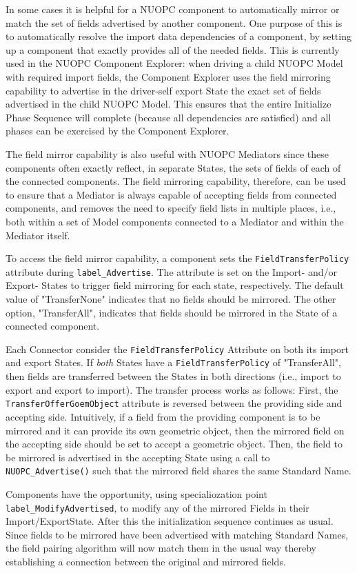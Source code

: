 %

\label{FieldMirror}

In some cases it is helpful for a NUOPC component to automatically mirror or match the set of fields advertised by another component.  One purpose of this is to automatically resolve the import data dependencies of a component, by setting up a component that exactly provides all of the needed fields.  This is currently used in the NUOPC Component Explorer:  when driving a child NUOPC Model with required import fields, the Component Explorer uses the field mirroring capability to advertise in the driver-self export State the exact set of fields advertised in the child NUOPC Model.  This ensures that the entire Initialize Phase Sequence will complete (because all dependencies are satisfied) and all phases can be exercised by the Component Explorer.

The field mirror capability is also useful with NUOPC Mediators since these components often exactly reflect, in separate States, the sets of fields of each of the connected components.  The field mirroring capability, therefore, can be used to ensure that a Mediator is always capable of accepting fields from connected components, and removes the need to specify field lists in multiple places, i.e., both within a set of Model components connected to a Mediator and within the Mediator itself.

To access the field mirror capability, a component sets the {\tt FieldTransferPolicy} attribute during {\tt label\_Advertise}. The attribute is set on the Import- and/or Export- States to trigger field mirroring for each state, respectively.  The default value of "TransferNone" indicates that no fields should be mirrored.  The other option, "TransferAll", indicates that fields should be mirrored in the State of a connected component.

Each Connector consider the {\tt FieldTransferPolicy} Attribute on both its import and export States.  If {\em both} States have a {\tt FieldTransferPolicy} of "TransferAll", then fields are transferred between the States in both directions (i.e., import to export and export to import).  The transfer process works as follows:  First, the {\tt TransferOfferGoemObject} attribute is reversed between the providing side and accepting side.  Intuitively, if a field from the providing component is to be mirrored and it can provide its own geometric object, then the mirrored field on the accepting side should be set to accept a geometric object.  Then, the field to be mirrored is advertised in the accepting State using a call to {\tt NUOPC\_Advertise()} such that the mirrored field shares the same Standard Name.

Components have the opportunity, using specialiozation point {\tt label\_ModifyAdvertised}, to modify any of the mirrored Fields in their Import/ExportState. After this the initialization sequence continues as usual.  Since fields to be mirrored have been advertised with matching Standard Names, the field pairing algorithm will now match them in the usual way thereby establishing a connection between the original and mirrored fields.

